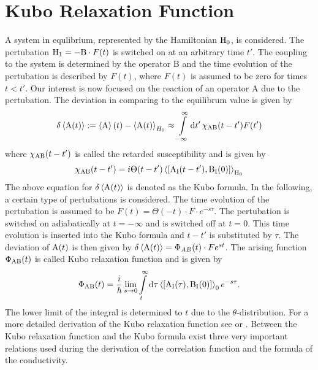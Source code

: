 \section{Kubo Relaxation Function}
\label{sec:kubo relaxation function}
%
%
A system in equlibrium, represented by the Hamiltonian $\mathrm{H}_{0}$, is considered.
The pertubation $\mathrm{H}_{1} = -\mathrm{B} \cdot F(t)$ is switched on at an arbitrary time $t'$.
The coupling to the system is determined by the operator B and the time evolution of the pertubation is described by $F(t)$, where $F(t)$ is assumed to be zero for times $t<t'$.
Our interest is now focused on the reaction of an operator A due to the pertubation.
The deviation in comparing to the equilibrum value is given by
%
\begin{align}
	\delta\expval{\mathrm{A}(t)} := \expval{\mathrm{A}}(t) - \expval{\mathrm{A}(t)}_{H_{0}} \approx \int\limits_{-\infty}^{\infty} \dd{t'} \chi_{\mathrm{AB}}(t-t') F(t')
	\label{eq:Kubo formula}
\end{align}
%
where $\chi_{\mathrm{AB}}(t-t')$ is called the retarded susceptibility and is given by
%
\begin{align}
	\chi_{\mt{AB}}(t-t') = i \Theta(t-t') \expval{\comm{\mt{A}_{\mt{I}}(t-t')}{\mt{B}_{\mt{I}}(0)}}_{\mt{H}_{0}}
	\label{eq:dynamical susceptibilty}
\end{align}
% 
The above equation for $\delta\expval{\mathrm{A}(t)}$ is denoted as the Kubo formula.
In the following, a certain type of pertubations is considered.
The time evolution of the pertubation is assumed to be $F(t) = \Theta(-t) \cdot F \cdot e^{-s\tau}$.
The pertubation is switched on adiabatically at $t = -\infty$ and is switched off at $t=0$.
This time evolution is inserted into the Kubo formula and $t-t'$ is substituted by $\tau$.
The deviation of $\mathrm{A}(t)$ is then given by $\delta\expval{\mathrm{A}(t)} = \Phi_{AB}(t) \cdot F e^{st}$.
The arising function $\Phi_{\mathrm{AB}}(t)$ is called Kubo relaxation function and is given by
%
\begin{align}
	\Phi_{\mt{AB}}(t) = \frac{i}{\hbar} \lim\limits_{s \to 0} \int\limits_{t}^{\infty} \dd{\tau} \expval{\comm{\mt{A}_{\mt{I}}(\tau)}{\mt{B}_{\mt{I}}(0)}}_{0} e^{-s\tau}.
	\label{eq:Kubo relaxation function}
\end{align}
%
The lower limit of the integral is determined to $t$ due to the $\theta$-distribution.
For a more detailed derivation of the Kubo relaxation function see \cite{Schwabl} or \cite{Schwabl2}.
Between the Kubo relaxation function and the Kubo formula exist three very important relations used during the derivation of the correlation function and the formula of the conductivity.
